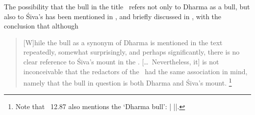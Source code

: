 \noindent
The possibility that the bull in the title \Vss\ refers 
not only to Dharma as a bull, but also
to Śiva's  has been mentioned
in , and briefly
discussed in , 
with the conclusion that although 

\begin{quote} 
[W]hile the bull as a synonym of Dharma is mentioned in the text repeatedly,
somewhat surprisingly, and perhaps significantly, there is no
clear reference to Śiva's mount in the \Vss. [\dots\ Nevertheless, it]
is not inconceivable that the redactors of the \Vss\ had
the same association in mind, namely that the bull in 
question is both Dharma and Śi­va's mount.%
	\footnote{Note that \SDhU\  12.87
				also mentions the `Dharma bull':
	     |
    	 ||. }
\end{quote} 



%



%
%

